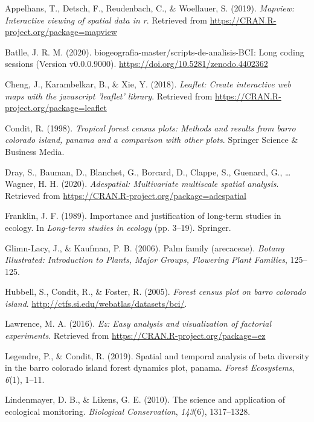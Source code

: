 \documentclass[11pt,]{article}
\begin{document}
\hypertarget{refs}{}
\hypertarget{ref-MapView}{}
Appelhans, T., Detsch, F., Reudenbach, C., \& Woellauer, S. (2019).
\emph{Mapview: Interactive viewing of spatial data in r}. Retrieved from
\url{https://CRAN.R-project.org/package=mapview}

\hypertarget{ref-jose_ramon_martinez_batlle_2020_4402362}{}
Batlle, J. R. M. (2020). biogeografia-master/scripts-de-analisis-BCI:
Long coding sessions (Version v0.0.0.9000).
\url{https://doi.org/10.5281/zenodo.4402362}

\hypertarget{ref-Leaflet}{}
Cheng, J., Karambelkar, B., \& Xie, Y. (2018). \emph{Leaflet: Create
interactive web maps with the javascript 'leaflet' library}. Retrieved
from \url{https://CRAN.R-project.org/package=leaflet}

\hypertarget{ref-condit1998tropical}{}
Condit, R. (1998). \emph{Tropical forest census plots: Methods and
results from barro colorado island, panama and a comparison with other
plots}. Springer Science \& Business Media.

\hypertarget{ref-adespatial}{}
Dray, S., Bauman, D., Blanchet, G., Borcard, D., Clappe, S., Guenard,
G., \ldots{} Wagner, H. H. (2020). \emph{Adespatial: Multivariate
multiscale spatial analysis}. Retrieved from
\url{https://CRAN.R-project.org/package=adespatial}

\hypertarget{ref-franklin1989importance}{}
Franklin, J. F. (1989). Importance and justification of long-term
studies in ecology. In \emph{Long-term studies in ecology} (pp. 3--19).
Springer.

\hypertarget{ref-glimn2006palm}{}
Glimn-Lacy, J., \& Kaufman, P. B. (2006). Palm family (arecaceae).
\emph{Botany Illustrated: Introduction to Plants, Major Groups,
Flowering Plant Families}, 125--125.

\hypertarget{ref-Hubbell2005Barro}{}
Hubbell, S., Condit, R., \& Foster, R. (2005). \emph{Forest census plot
on barro colorado island}.
\url{http://ctfs.si.edu/webatlas/datasets/bci/}.

\hypertarget{ref-EZ}{}
Lawrence, M. A. (2016). \emph{Ez: Easy analysis and visualization of
factorial experiments}. Retrieved from
\url{https://CRAN.R-project.org/package=ez}

\hypertarget{ref-legendre2019spatial}{}
Legendre, P., \& Condit, R. (2019). Spatial and temporal analysis of
beta diversity in the barro colorado island forest dynamics plot,
panama. \emph{Forest Ecosystems}, \emph{6}(1), 1--11.

\hypertarget{ref-lindenmayer2010science}{}
Lindenmayer, D. B., \& Likens, G. E. (2010). The science and application
of ecological monitoring. \emph{Biological Conservation}, \emph{143}(6),
1317--1328.
\end{document}
